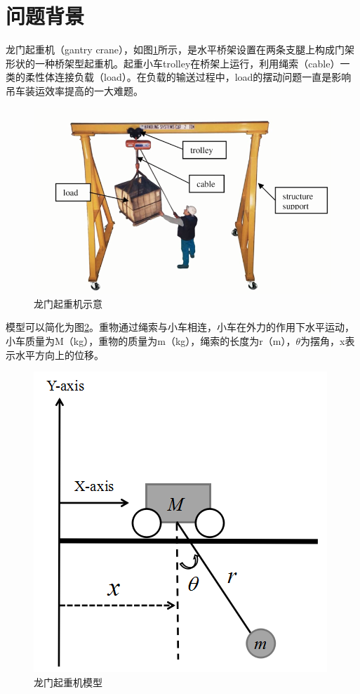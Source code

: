 \documentclass[]{ctexbook}
\theoremstyle{definition}
\theoremstyle{definition}
\theoremstyle{definition}
\theoremstyle{remark}
\begin{document}
\section{问题背景}

龙门起重机（gantry
crane），如图\ref{fig:gc}所示，是水平桥架设置在两条支腿上构成门架形状的一种桥架型起重机。起重小车trolley在桥架上运行，利用绳索（cable）一类的柔性体连接负载（load）。在负载的输送过程中，load的摆动问题一直是影响吊车装运效率提高的一大难题。

\begin{figure}

{\centering \includegraphics[width=0.7\linewidth]{img/gc} 

}

\caption{龙门起重机示意}\label{fig:gc}
\end{figure}

模型可以简化为图\ref{fig:gc2}。重物通过绳索与小车相连，小车在外力的作用下水平运动，小车质量为M（kg），重物的质量为m（kg），绳索的长度为r（m），\(\theta\)为摆角，x表示水平方向上的位移。

\begin{figure}

{\centering \includegraphics[width=0.6\linewidth]{img/gc2} 

}

\caption{龙门起重机模型}\label{fig:gc2}
\end{figure}
\end{document}
